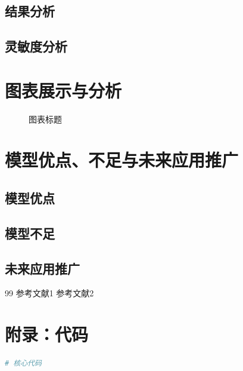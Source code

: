 \subsection{结果分析}

\subsection{灵敏度分析}

\section{图表展示与分析}

\begin{figure}[H]
  \centering
  \caption{图表标题}
  \label{fig:example}
\end{figure}

\section{模型优点、不足与未来应用推广}

\subsection{模型优点}

\subsection{模型不足}

\subsection{未来应用推广}

\newpage
\begin{thebibliography}{99}
   参考文献1
   参考文献2
\end{thebibliography}

\newpage
\appendix
\section{附录：代码}

\begin{lstlisting}[language=Python, caption={主要代码}]
# 核心代码
\end{lstlisting}


